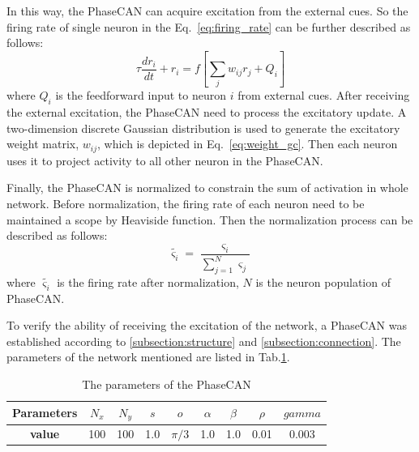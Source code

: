 \documentclass[final,5p,times,twocolumn,authoryear]{elsarticle}
\begin{document}
In this way, the PhaseCAN can acquire excitation from the external cues. So the firing rate of single neuron in the Eq.~\eqref{eq:firing_rate} can be further described as follows:
\begin{equation}\label{eq:firing_rate_modify}
	\tau \frac{d r_{i}}{d t}+r_{i}=f\left[\sum_{j} w_{i j} r_{j} + Q_i\right]
\end{equation}
where $Q_i$ is the feedforward input to neuron $i$ from external cues. After receiving the external excitation, the PhaseCAN need to process the excitatory update. A two-dimension discrete Gaussian distribution is used to generate the excitatory weight matrix, $w_{ij}$, which is depicted in Eq.~\eqref{eq:weight_gc}. Then each neuron uses it to project activity to all other neuron in the PhaseCAN.

Finally, the PhaseCAN is normalized to constrain the sum of activation in whole network. Before normalization, the firing rate of each neuron need to be maintained a scope by Heaviside function. Then the normalization process can be described as follows:
\begin{equation}\label{eq:normalization}
	\tilde{\varsigma_i} = \frac{\varsigma_i}{\sum_{j=1}^{N} \varsigma_j}
\end{equation}
where $\tilde{\varsigma_i}$ is the firing rate after normalization, $N$ is the neuron population of PhaseCAN.



To verify the ability of receiving the excitation of the network, a PhaseCAN was established according to \ref{subsection:structure} and \ref{subsection:connection}. The parameters of the network mentioned are listed in Tab.\ref{tab:model_parameter}.

\begin{table}[h]
	\centering
	\caption{The parameters of the PhaseCAN}
	\label{tab:model_parameter}
	\begin{tabular}{c c c c c c c c c }		
		\toprule
		\textbf{Parameters}&$N_x$& $N_y$&$s$ &$o$ &$\alpha$ &$\beta$ &$\rho$ &$gamma$ \\
		\midrule
		\textbf{value}&100&100&1.0&$\pi/3$&1.0&1.0&0.01&0.003\\
		\bottomrule
	\end{tabular}
\end{table}
\end{document}
